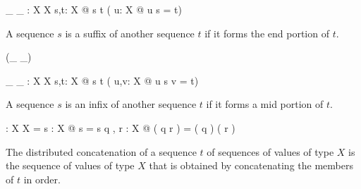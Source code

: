 \documentclass[draft,a4paper,10pt,wd]{isov2}
\begin{document}
\begin{gendef}[X]
\_ \suffix \_ : \seq X \rel \seq X
\where
\forall s,t: \seq X @
s \suffix t \iff ( \exists u: \seq X @ u \cat s = t)
\end{gendef}

A sequence $s$ is a suffix of another sequence $t$
if it forms the end portion of $t$.


\begin{zed}
\relation (\_ \infix \_)
\end{zed}

\begin{gendef}[X]
\_ \infix \_ : \seq X \rel \seq X
\where
\forall s,t: \seq X @
s \infix t \iff ( \exists u,v: \seq X @ u \cat s \cat v = t)
\end{gendef}

A sequence $s$ is an infix of another sequence $t$
if it forms a mid portion of $t$.


\begin{gendef}[X]
\dcat : \seq \seq X \fun \seq X
\where
\dcat \langle \rangle = \langle \rangle
\also
\forall s : \seq X @ \dcat \langle s \rangle = s
\also
\forall q , r : \seq \seq X @ \dcat ( q \cat r ) = ( \dcat q ) \cat ( \dcat r )
\end{gendef}

The distributed concatenation of a sequence $t$
of sequences of values of type $X$
is the sequence of values of type $X$
that is obtained by concatenating the members of $t$ in order.
\end{document}
